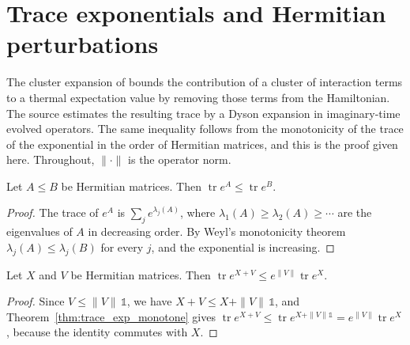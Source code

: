 \section{Trace exponentials and Hermitian perturbations}
\label{sec:trace_exponential_perturbation}


The cluster expansion of \cite{Hastings2006Solving} bounds the contribution of a
cluster of interaction terms to a thermal expectation value by removing those
terms from the Hamiltonian. The source estimates the resulting trace by a Dyson
expansion in imaginary-time evolved operators. The same inequality follows from
the monotonicity of the trace of the exponential in the order of Hermitian
matrices, and this is the proof given here. Throughout, $\|\cdot\|$ is the
operator norm.

\begin{theorem}
    \label{thm:trace_exp_monotone}
    \leanok
    Let $A\le B$ be Hermitian matrices. Then
    $\operatorname{tr}e^{A}\le\operatorname{tr}e^{B}$.
\end{theorem}
\begin{proof}\leanok
    The trace of $e^{A}$ is $\sum_j e^{\lambda_j(A)}$, where
    $\lambda_1(A)\ge\lambda_2(A)\ge\cdots$ are the eigenvalues of $A$ in
    decreasing order. By Weyl's monotonicity theorem $\lambda_j(A)\le\lambda_j(B)$
    for every $j$, and the exponential is increasing.
\end{proof}

\begin{theorem}
    \label{thm:trace_exp_add_le}
    \leanok
    Let $X$ and $V$ be Hermitian matrices. Then
    $\operatorname{tr}e^{X+V}\le e^{\|V\|}\operatorname{tr}e^{X}$.
\end{theorem}
\begin{proof}\leanok
    Since $V\le\|V\|\,\mathbb{1}$, we have $X+V\le X+\|V\|\,\mathbb{1}$, and
    Theorem~\ref{thm:trace_exp_monotone} gives
    $\operatorname{tr}e^{X+V}\le\operatorname{tr}e^{X+\|V\|\mathbb{1}}
        =e^{\|V\|}\operatorname{tr}e^{X}$, because the identity commutes with $X$.
\end{proof}

